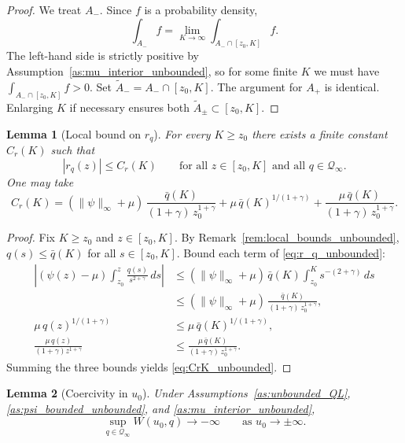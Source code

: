 \documentclass[12pt,a4paper]{article}
\theoremstyle{definition}
\theoremstyle{plain}
\newtheorem{lemma}{Lemma}[section]
\theoremstyle{remark}
\newcommand{\zlow}{z_{\scriptscriptstyle 0}}
\begin{document}
\begin{proof}
We treat $A_-$.  Since $f$ is a probability density,
\[
  \int_{A_-} f
  = \lim_{K\to\infty} \int_{A_- \cap [\zlow,K]} f.
\]
The left-hand side is strictly positive by
Assumption~\ref{as:mu_interior_unbounded}, so for some finite $K$ we
must have $\int_{A_- \cap [\zlow,K]} f > 0$.  Set
$\widetilde A_- = A_- \cap [\zlow,K]$.  The argument for $A_+$ is
identical.  Enlarging $K$ if necessary ensures both
$\widetilde A_\pm \subset [\zlow,K]$.
\end{proof}

\begin{lemma}[Local bound on $r_q$]
\label{lem:rq_local_unbounded}
For every $K \geq \zlow$ there exists a finite constant $C_r(K)$ such
that
\[
  |r_q(z)| \leq C_r(K)
  \qquad \text{for all } z \in [\zlow,K]
  \text{ and all } q \in \mathcal{Q}_\infty.
\]
One may take
\begin{equation}
\label{eq:CrK_unbounded}
  C_r(K)
  = (\|\psi\|_\infty + \mu)\,
    \frac{\bar q(K)}{(1+\gamma)\,\zlow^{1+\gamma}}
  + \mu\,\bar q(K)^{1/(1+\gamma)}
  + \frac{\mu\,\bar q(K)}{(1+\gamma)\,\zlow^{1+\gamma}}.
\end{equation}
\end{lemma}

\begin{proof}
Fix $K \geq \zlow$ and $z \in [\zlow,K]$.  By
Remark~\ref{rem:local_bounds_unbounded},
$q(s) \leq \bar q(K)$ for all $s \in [\zlow,K]$.
Bound each term of \eqref{eq:r_q_unbounded}:
\begin{align*}
  \left|(\psi(z)-\mu)\int_{\zlow}^z
    \frac{q(s)}{s^{2+\gamma}}\,ds\right|
  &\leq (\|\psi\|_\infty + \mu)\,\bar q(K)
    \int_{\zlow}^{K} s^{-(2+\gamma)}\,ds \\
  &\leq (\|\psi\|_\infty + \mu)\,
    \frac{\bar q(K)}{(1+\gamma)\,\zlow^{1+\gamma}}, \\
  \mu\,q(z)^{1/(1+\gamma)}
  &\leq \mu\,\bar q(K)^{1/(1+\gamma)}, \\
  \frac{\mu\,q(z)}{(1+\gamma)z^{1+\gamma}}
  &\leq \frac{\mu\,\bar q(K)}{(1+\gamma)\,\zlow^{1+\gamma}}.
\end{align*}
Summing the three bounds yields \eqref{eq:CrK_unbounded}.
\end{proof}

\begin{lemma}[Coercivity in $u_0$]
\label{lem:coercive_unbounded}
Under Assumptions~\ref{as:unbounded_QL},
\ref{as:psi_bounded_unbounded}, and
\ref{as:mu_interior_unbounded},
\[
  \sup_{q \in \mathcal{Q}_\infty} W(u_0,q) \to -\infty
  \qquad \text{as } u_0 \to \pm\infty.
\]
\end{lemma}
\end{document}
